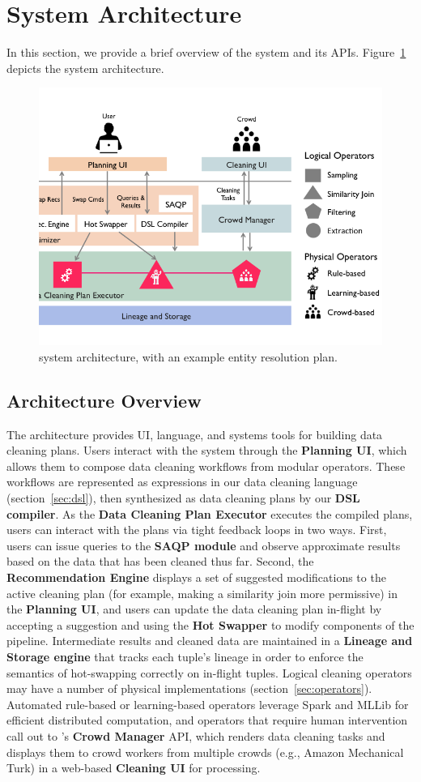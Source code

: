 \section{System Architecture}

In this section, we provide a brief overview of the \sys system and its APIs.
Figure~\ref{fig:arch} depicts the system architecture.

\begin{figure}[t]
\centering
\vspace{-0.5cm}
\includegraphics[width = .5\textwidth]{figs/architecture.png}
\vspace{-1.2cm}
\caption{\sys system architecture, with an example entity resolution plan.}
\vspace{-0.7cm}
\label{fig:arch}
\end{figure}

\subsection{Architecture Overview}
The \sys architecture provides UI, language, and systems tools for building data cleaning plans.
Users interact with the system through the \textbf{Planning UI}, which allows them to compose data cleaning workflows from modular operators.
These workflows are represented as expressions in our data cleaning language (section~\ref{sec:dsl}), then synthesized as data cleaning plans by our \textbf{DSL compiler}.
As the \textbf{Data Cleaning Plan Executor} executes the compiled plans, users can interact with the plans via tight feedback loops in two ways.
First, users can issue queries to the \textbf{SAQP module} and observe approximate results based on the data that has been cleaned thus far.
Second, the \textbf{Recommendation Engine} displays a set of suggested modifications to the active cleaning plan (for example, making a similarity join more permissive) in the \textbf{Planning UI}, and users can update the data cleaning plan in-flight by accepting a suggestion and using the \textbf{Hot Swapper} to modify components of the pipeline.
Intermediate results and cleaned data are maintained in a \textbf{Lineage and Storage engine} that tracks each tuple's lineage in order to enforce the semantics of hot-swapping correctly on in-flight tuples.
Logical cleaning operators may have a number of physical implementations (section~\ref{sec:operators}).
Automated rule-based or learning-based operators leverage Spark and MLLib for efficient distributed computation, and operators that require human intervention call out to \sys's \textbf{Crowd Manager} API, which renders data cleaning tasks and displays them to crowd workers from multiple crowds (e.g., Amazon Mechanical Turk) in a web-based \textbf{Cleaning UI} for processing.

